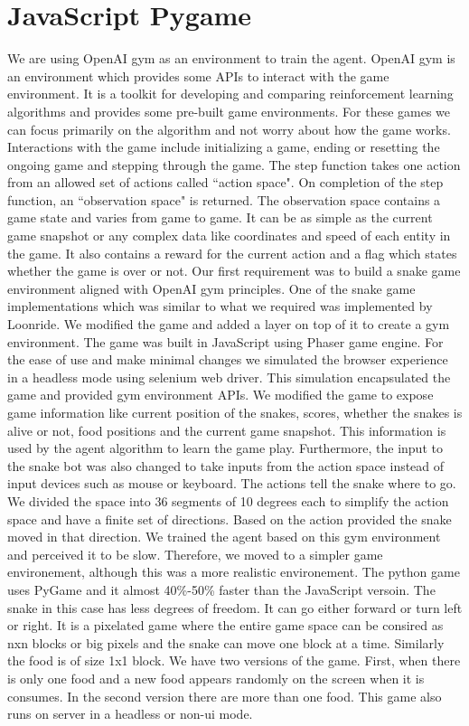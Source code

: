 \documentclass{article}
\begin{document}
\section{JavaScript Pygame}
We are using OpenAI gym\cite{sd2} as an environment to train the agent. OpenAI gym is an environment which provides some APIs to interact with the game environment. It is a toolkit for developing and comparing reinforcement learning algorithms and provides some pre-built game environments. For these games we can focus primarily on the algorithm and not worry about how the game works. Interactions with the game include initializing a game, ending or resetting the ongoing game and stepping through the game. The step function takes one action from an allowed set of actions called ``action space". On completion of the step function, an ``observation space" is returned. The observation space contains a game state and varies from game to game. It can be as simple as the current game snapshot  or any complex data like coordinates and speed of each entity in the game. It also contains a reward for the current action and a flag which states whether the game is over or not.
\break
\break
Our first requirement was to build a snake game environment aligned with OpenAI gym principles. One of the snake game implementations which was similar to what we required was implemented by Loonride\cite{sd1}. We modified the game and added a layer on top of it to create a gym environment. The game was built in JavaScript using Phaser game engine. For the ease of use and make minimal changes we simulated the browser experience in a headless mode using selenium web driver. This simulation encapsulated the game and provided gym environment APIs.
\break
\break
We modified the game to expose game information like current position of the snakes, scores, whether the snakes is alive or not, food positions and the current game snapshot. This information is used by the agent algorithm to learn the game play. Furthermore, the input to the snake bot was also changed to take inputs from the action space instead of input devices such as mouse or keyboard. The actions tell the snake where to go. We divided the space into 36 segments of 10 degrees each to simplify the action space and have a finite set of directions. Based on the action provided the snake moved in that direction.
\break
\break
We trained the agent based on this gym environment and perceived it to be slow. Therefore, we moved to a simpler game environement, although this was a more realistic environement. The python game uses PyGame and it almost 40\%-50\% faster than the JavaScript versoin. The snake in this case has less degrees of freedom. It can go either forward or turn left or right. It is a pixelated game where the entire game space can be consired as nxn blocks or big pixels and the snake can move one block at a time. Similarly the food is of size 1x1 block. We have two versions of the game. First, when there is only one food and a new food appears randomly on the screen when it is consumes. In the second version there are more than one food. This game also runs on server in a headless or non-ui mode.
\end{document}
